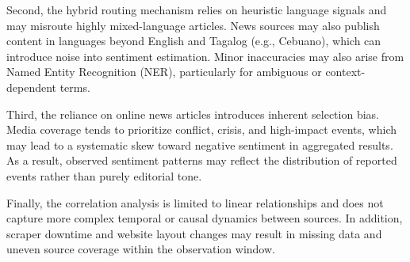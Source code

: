 \documentclass[sigconf, nonacm]{acmart}
\begin{document}
Second, the hybrid routing mechanism relies on heuristic language signals and may misroute highly mixed-language articles. News sources may also publish content in languages beyond English and Tagalog (e.g., Cebuano), which can introduce noise into sentiment estimation. Minor inaccuracies may also arise from Named Entity Recognition (NER), particularly for ambiguous or context-dependent terms.

Third, the reliance on online news articles introduces inherent selection bias. Media coverage tends to prioritize conflict, crisis, and high-impact events, which may lead to a systematic skew toward negative sentiment in aggregated results. As a result, observed sentiment patterns may reflect the distribution of reported events rather than purely editorial tone.

Finally, the correlation analysis is limited to linear relationships and does not capture more complex temporal or causal dynamics between sources. In addition, scraper downtime and website layout changes may result in missing data and uneven source coverage within the observation window.
\end{document}
